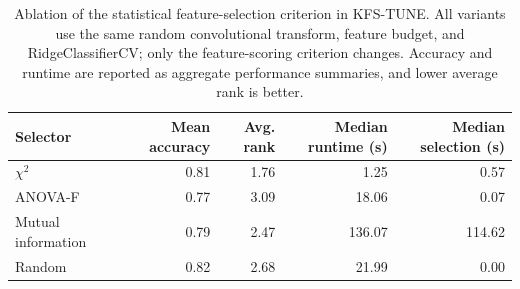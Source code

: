 \begin{table}[t]
\centering
\footnotesize
\caption{Ablation of the statistical feature-selection criterion in KFS-TUNE. All variants use the same random convolutional transform, feature budget, and RidgeClassifierCV; only the feature-scoring criterion changes. Accuracy and runtime are reported as aggregate performance summaries, and lower average rank is better.}
\label{tab:selector_ablation}
\begin{tabular}{lrrrr}
\toprule
Selector & Mean accuracy & Avg. rank & Median runtime (s) & Median selection (s) \\
\midrule
$\chi^2$ & 0.81 & 1.76 & 1.25 & 0.57 \\
ANOVA-F & 0.77 & 3.09 & 18.06 & 0.07 \\
Mutual information & 0.79 & 2.47 & 136.07 & 114.62 \\
Random & 0.82 & 2.68 & 21.99 & 0.00 \\
\bottomrule
\end{tabular}
\end{table}
